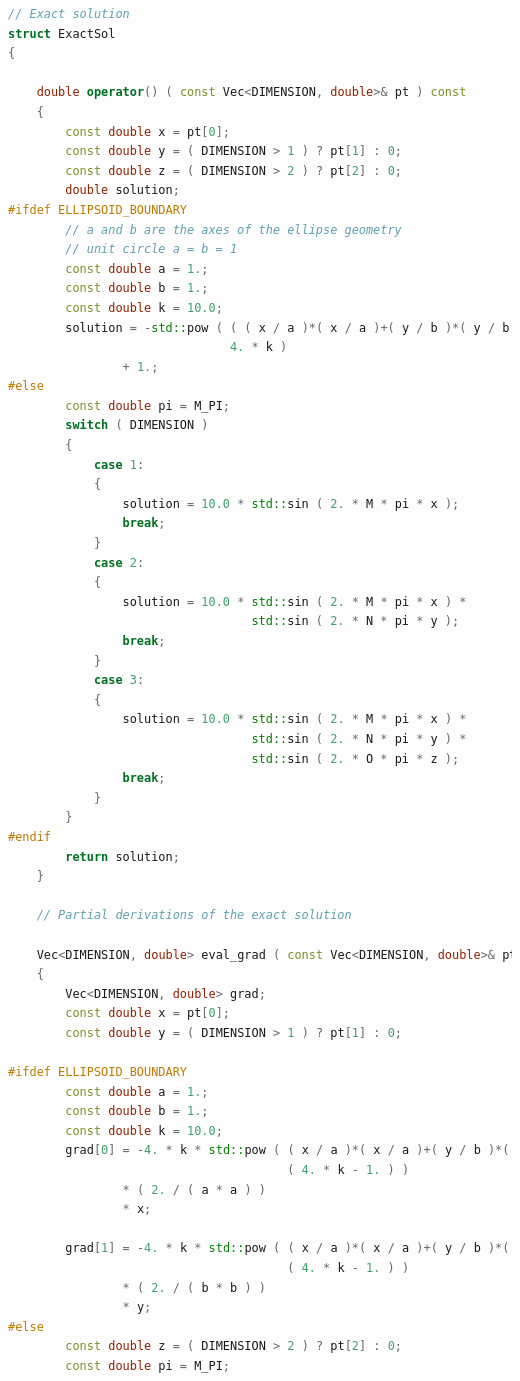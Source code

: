 \documentclass[a4paper, 11pt, twoside]{article}
\begin{document}
\begin{lstlisting}[language=C++, basicstyle={\footnotesize, \ttfamily}, keywordstyle=\color{blue}, numbers=none, tabsize=4]
// Exact solution
struct ExactSol
{

    double operator() ( const Vec<DIMENSION, double>& pt ) const
    {
        const double x = pt[0];
        const double y = ( DIMENSION > 1 ) ? pt[1] : 0;
        const double z = ( DIMENSION > 2 ) ? pt[2] : 0;
        double solution;
#ifdef ELLIPSOID_BOUNDARY
        // a and b are the axes of the ellipse geometry
        // unit circle a = b = 1
        const double a = 1.;
        const double b = 1.;
        const double k = 10.0;
        solution = -std::pow ( ( ( x / a )*( x / a )+( y / b )*( y / b ) ),
                               4. * k )
                + 1.;
#else
        const double pi = M_PI;
        switch ( DIMENSION )
        {
            case 1:
            {
                solution = 10.0 * std::sin ( 2. * M * pi * x );
                break;
            }
            case 2:
            {
                solution = 10.0 * std::sin ( 2. * M * pi * x ) * 
                                  std::sin ( 2. * N * pi * y );
                break;
            }
            case 3:
            {
                solution = 10.0 * std::sin ( 2. * M * pi * x ) * 
                                  std::sin ( 2. * N * pi * y ) * 
                                  std::sin ( 2. * O * pi * z );
                break;
            }
        }
#endif
        return solution;
    }

    // Partial derivations of the exact solution

    Vec<DIMENSION, double> eval_grad ( const Vec<DIMENSION, double>& pt ) const
    {
        Vec<DIMENSION, double> grad;
        const double x = pt[0];
        const double y = ( DIMENSION > 1 ) ? pt[1] : 0;

#ifdef ELLIPSOID_BOUNDARY
        const double a = 1.;
        const double b = 1.;
        const double k = 10.0;
        grad[0] = -4. * k * std::pow ( ( x / a )*( x / a )+( y / b )*( y / b ),
                                       ( 4. * k - 1. ) )
                * ( 2. / ( a * a ) )
                * x;

        grad[1] = -4. * k * std::pow ( ( x / a )*( x / a )+( y / b )*( y / b ),
                                       ( 4. * k - 1. ) )
                * ( 2. / ( b * b ) )
                * y;
#else
        const double z = ( DIMENSION > 2 ) ? pt[2] : 0;
        const double pi = M_PI;


\end{lstlisting}
\end{document}
